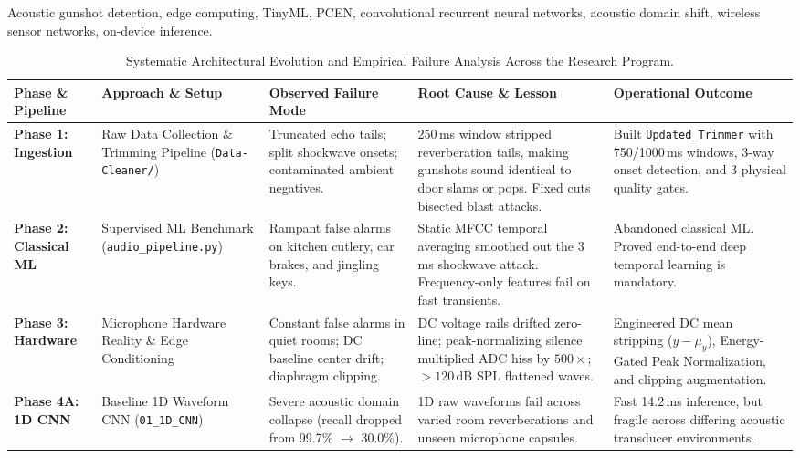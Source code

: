 \documentclass[conference]{IEEEtran}
\begin{document}
\begin{IEEEkeywords}
Acoustic gunshot detection, edge computing, TinyML, PCEN, convolutional recurrent neural networks, acoustic domain shift, wireless sensor networks, on-device inference.
\end{IEEEkeywords}

\begin{table}[!t]
\centering
\caption{Systematic Architectural Evolution and Empirical Failure Analysis Across the Research Program.}
\label{tab:master_evolution}
\small
\begin{tabular}{lp{3.2cm}p{3.5cm}p{3.8cm}p{3.5cm}}
\toprule
\textbf{Phase \& Pipeline} & \textbf{Approach \& Setup} & \textbf{Observed Failure Mode} & \textbf{Root Cause \& Lesson} & \textbf{Operational Outcome} \\
\midrule
\textbf{Phase 1: Ingestion} & Raw Data Collection \& Trimming Pipeline (\texttt{Data-Cleaner/}) & Truncated echo tails; split shockwave onsets; contaminated ambient negatives. & 250\,ms window stripped reverberation tails, making gunshots sound identical to door slams or pops. Fixed cuts bisected blast attacks. & Built \texttt{Updated\_Trimmer} with 750/1000\,ms windows, 3-way onset detection, and 3 physical quality gates. \\
\midrule
\textbf{Phase 2: Classical ML} & Supervised ML Benchmark (\texttt{audio\_pipeline.py}) & Rampant false alarms on kitchen cutlery, car brakes, and jingling keys. & Static MFCC temporal averaging smoothed out the 3\,ms shockwave attack. Frequency-only features fail on fast transients. & Abandoned classical ML. Proved end-to-end deep temporal learning is mandatory. \\
\midrule
\textbf{Phase 3: Hardware} & Microphone Hardware Reality \& Edge Conditioning & Constant false alarms in quiet rooms; DC baseline center drift; diaphragm clipping. & DC voltage rails drifted zero-line; peak-normalizing silence multiplied ADC hiss by $500\times$; $>120\,\text{dB}$ SPL flattened waves. & Engineered DC mean stripping ($y - \mu_y$), Energy-Gated Peak Normalization, and clipping augmentation. \\
\midrule
\textbf{Phase 4A: 1D CNN} & Baseline 1D Waveform CNN (\texttt{01\_1D\_CNN}) & Severe acoustic domain collapse (recall dropped from 99.7\% $\to$ 30.0\%). & 1D raw waveforms fail across varied room reverberations and unseen microphone capsules. & Fast 14.2\,ms inference, but fragile across differing acoustic transducer environments. \\

\end{tabular}
\end{table}
\end{document}

